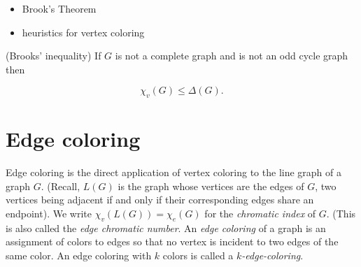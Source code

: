 \begin{itemize}
\item Brook's Theorem
\item heuristics for vertex coloring
\end{itemize}

\begin{theorem}
(Brooks' inequality)
If $G$ is not a complete graph and is not an odd cycle graph then

\[
    \chi_v(G) \le \Delta(G).
\]
\end{theorem}


\section{Edge coloring}

Edge coloring is the direct application of vertex coloring to the
line graph of a graph $G$. (Recall, $L(G)$ is the graph whose
vertices are the edges of $G$, two vertices being adjacent if and
only if their corresponding edges share an endpoint).
We write $\chi_v(L(G)) = \chi_e(G)$ for the {\it chromatic index} of $G$.
(This is also called the {\it edge chromatic number}.
An {\it edge coloring} of a graph is an assignment of colors to
edges so that no vertex is
incident to two edges of the same color. An edge coloring with
$k$ colors is called a {\it $k$-edge-coloring}.

